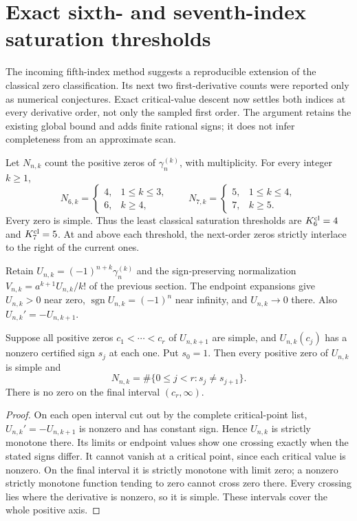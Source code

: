 \section{Exact sixth- and seventh-index saturation thresholds}
\label{higherzeros:sec:thresholds}
The incoming fifth-index method suggests a reproducible extension of the
classical zero classification. Its next two first-derivative counts were
reported only as numerical conjectures. Exact critical-value descent now
settles both indices at every derivative order, not only the sampled first
order. The argument retains the existing global bound and adds finite
rational signs; it does not infer completeness from an approximate scan.

\begin{theorem}
\label{higherzeros:thm:thresholds}
Let $N_{n,k}$ count the positive zeros of $\gamma_n^{(k)}$, with
multiplicity. For every integer $k\ge1$,
\[
 N_{6,k}=\begin{cases}4,&1\le k\le3,\\6,&k\ge4,\end{cases}
 \qquad
 N_{7,k}=\begin{cases}5,&1\le k\le4,\\7,&k\ge5.\end{cases}
\]
Every zero is simple. Thus the least classical saturation thresholds are
$K_6^{\rm cl}=4$ and $K_7^{\rm cl}=5$. At and above each threshold,
the next-order zeros strictly interlace to the right of the current ones.
\end{theorem}

Retain $U_{n,k}=(-1)^{n+k}\gamma_n^{(k)}$ and the sign-preserving
normalization $V_{n,k}=a^{k+1}U_{n,k}/k!$ of the previous section.
The endpoint expansions give $U_{n,k}>0$ near zero,
$\operatorname{sgn}U_{n,k}=(-1)^n$ near infinity, and $U_{n,k}\to0$
there. Also $U_{n,k}'=-U_{n,k+1}$.

\begin{lemma}
\label{higherzeros:lem:descent}
Suppose all positive zeros $c_1<\cdots<c_r$ of $U_{n,k+1}$ are
simple, and $U_{n,k}(c_j)$ has a nonzero certified sign $s_j$ at
each one. Put $s_0=1$. Then every positive zero of $U_{n,k}$ is
simple and
\[
 N_{n,k}=\#\{0\le j<r:s_j\ne s_{j+1}\}.
\]
There is no zero on the final interval $(c_r,\infty)$.
\end{lemma}
\begin{proof}
On each open interval cut out by the complete critical-point list,
$U_{n,k}'=-U_{n,k+1}$ is nonzero and has constant sign. Hence
$U_{n,k}$ is strictly monotone there. Its limits or endpoint values
show one crossing exactly when the stated signs differ. It cannot
vanish at a critical point, since each critical value is nonzero.
On the final interval it is strictly monotone with limit zero; a
nonzero strictly monotone function tending to zero cannot cross zero
there. Every crossing lies where the derivative is nonzero, so it
is simple. These intervals cover the whole positive axis.
\end{proof}

